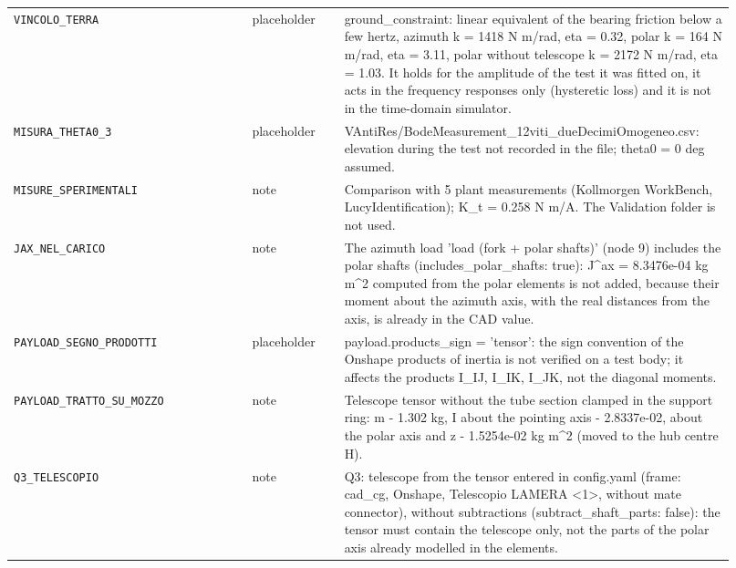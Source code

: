 \documentclass[10pt,a4paper]{article}
\numberwithin{equation}{section}
\begin{document}
\begin{longtable}{p{0.31\linewidth}p{0.12\linewidth}p{0.49\linewidth}}
\texttt{VINCOLO\_TERRA} & placeholder & ground\_constraint: linear equivalent of the bearing friction below a few hertz, azimuth k = 1418 N m/rad, eta = 0.32, polar k = 164 N m/rad, eta = 3.11, polar without telescope k = 2172 N m/rad, eta = 1.03. It holds for the amplitude of the test it was fitted on, it acts in the frequency responses only (hysteretic loss) and it is not in the time-domain simulator. \\
\texttt{MISURA\_THETA0\_3} & placeholder & VAntiRes/BodeMeasurement\_12viti\_dueDecimiOmogeneo.csv: elevation during the test not recorded in the file; theta0 = 0 deg assumed. \\
\texttt{MISURE\_SPERIMENTALI} & note & Comparison with 5 plant measurements (Kollmorgen WorkBench, LucyIdentification); K\_t = 0.258 N m/A. The Validation folder is not used. \\
\texttt{JAX\_NEL\_CARICO} & note & The azimuth load 'load (fork + polar shafts)' (node 9) includes the polar shafts (includes\_polar\_shafts: true): J\^{}ax = 8.3476e-04 kg m\^{}2 computed from the polar elements is not added, because their moment about the azimuth axis, with the real distances from the axis, is already in the CAD value. \\
\texttt{PAYLOAD\_SEGNO\_PRODOTTI} & placeholder & payload.products\_sign = 'tensor': the sign convention of the Onshape products of inertia is not verified on a test body; it affects the products I\_IJ, I\_IK, I\_JK, not the diagonal moments. \\
\texttt{PAYLOAD\_TRATTO\_SU\_MOZZO} & note & Telescope tensor without the tube section clamped in the support ring: m - 1.302 kg, I about the pointing axis - 2.8337e-02, about the polar axis and z - 1.5254e-02 kg m\^{}2 (moved to the hub centre H). \\
\texttt{Q3\_TELESCOPIO} & note & Q3: telescope from the tensor entered in config.yaml (frame: cad\_cg, Onshape, Telescopio LAMERA <1>, without mate connector), without subtractions (subtract\_shaft\_parts: false): the tensor must contain the telescope only, not the parts of the polar axis already modelled in the elements. \\
\bottomrule\end{longtable}
\end{document}
